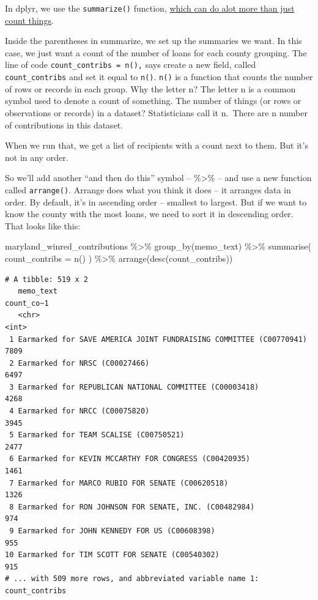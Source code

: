 \documentclass[
  letterpaper,
  DIV=11,
  numbers=noendperiod]{scrreprt}
\newenvironment{Shaded}{\begin{snugshade}}{\end{snugshade}}
\newcommand{\AttributeTok}[1]{\textcolor[rgb]{0.40,0.45,0.13}{#1}}
\newcommand{\FunctionTok}[1]{\textcolor[rgb]{0.28,0.35,0.67}{#1}}
\newcommand{\NormalTok}[1]{\textcolor[rgb]{0.00,0.23,0.31}{#1}}
\newcommand{\SpecialCharTok}[1]{\textcolor[rgb]{0.37,0.37,0.37}{#1}}
\begin{document}
In dplyr, we use the \texttt{summarize()} function,
\href{http://dplyr.tidyverse.org/reference/summarise.html}{which can do
alot more than just count things}.

Inside the parentheses in summarize, we set up the summaries we want. In
this case, we just want a count of the number of loans for each county
grouping. The line of code \texttt{count\_contribs\ =\ n(),} says create
a new field, called \texttt{count\_contribs} and set it equal to
\texttt{n()}. \texttt{n()} is a function that counts the number of rows
or records in each group. Why the letter n? The letter n is a common
symbol used to denote a count of something. The number of things (or
rows or observations or records) in a dataset? Statisticians call it
n.~There are n number of contributions in this dataset.

When we run that, we get a list of recipients with a count next to them.
But it's not in any order.

So we'll add another ``and then do this'' symbol -- \%\textgreater\% --
and use a new function called \texttt{arrange()}. Arrange does what you
think it does -- it arranges data in order. By default, it's in
ascending order -- smallest to largest. But if we want to know the
county with the most loans, we need to sort it in descending order. That
looks like this:

\begin{Shaded}
\begin{Highlighting}[]
\NormalTok{maryland\_winred\_contributions }\SpecialCharTok{\%\textgreater{}\%}
  \FunctionTok{group\_by}\NormalTok{(memo\_text) }\SpecialCharTok{\%\textgreater{}\%}
  \FunctionTok{summarise}\NormalTok{(}
    \AttributeTok{count\_contribs =} \FunctionTok{n}\NormalTok{()}
\NormalTok{  ) }\SpecialCharTok{\%\textgreater{}\%}
  \FunctionTok{arrange}\NormalTok{(}\FunctionTok{desc}\NormalTok{(count\_contribs))}
\end{Highlighting}
\end{Shaded}

\begin{verbatim}
# A tibble: 519 x 2
   memo_text                                                          count_co~1
   <chr>                                                                   <int>
 1 Earmarked for SAVE AMERICA JOINT FUNDRAISING COMMITTEE (C00770941)       7809
 2 Earmarked for NRSC (C00027466)                                           6497
 3 Earmarked for REPUBLICAN NATIONAL COMMITTEE (C00003418)                  4268
 4 Earmarked for NRCC (C00075820)                                           3945
 5 Earmarked for TEAM SCALISE (C00750521)                                   2477
 6 Earmarked for KEVIN MCCARTHY FOR CONGRESS (C00420935)                    1461
 7 Earmarked for MARCO RUBIO FOR SENATE (C00620518)                         1326
 8 Earmarked for RON JOHNSON FOR SENATE, INC. (C00482984)                    974
 9 Earmarked for JOHN KENNEDY FOR US (C00608398)                             955
10 Earmarked for TIM SCOTT FOR SENATE (C00540302)                            915
# ... with 509 more rows, and abbreviated variable name 1: count_contribs
\end{verbatim}
\end{document}
